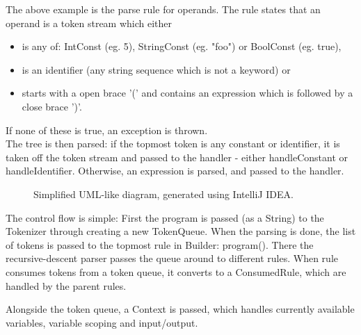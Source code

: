\documentclass{article}
\begin{document}
The above example is the parse rule for operands. The rule states that an
operand is a token stream which either

\begin{itemize}
    \item is any of: IntConst (eg. 5), StringConst (eg. "foo") or BoolConst
        (eg. true),
    \item is an identifier (any string sequence which is not a keyword) or
    \item starts with a open brace '(' and contains an expression which is
        followed by a close brace ')'.
\end{itemize}
\noindent
If none of these is true, an exception is thrown. \\

The tree is then parsed: if the topmost token is any constant or identifier,
it is taken off the token stream and passed to the handler - either handleConstant or handleIdentifier.
Otherwise, an expression is parsed, and passed to the handler.

\FloatBarrier
\begin{figure}[ht!]
    \begin{center}
    \end{center}
    \caption{Simplified UML-like diagram, generated using IntelliJ IDEA.}
    \label{fig:uml}
\end{figure}
\FloatBarrier

The control flow is simple: First the program is passed (as a String) to
the Tokenizer through creating a new TokenQueue. When the parsing is done, the
list of tokens is passed to the topmost rule in Builder: program(). There the
recursive-descent parser passes the queue around to different rules. When rule
consumes tokens from a token queue, it converts to a ConsumedRule, which are
handled by the parent rules.

Alongside the token queue, a Context is passed, which handles currently
available variables, variable scoping and input/output.
\end{document}
